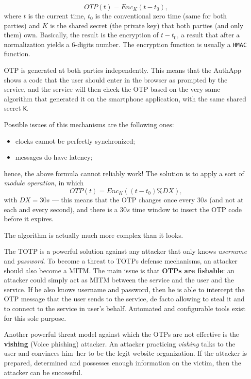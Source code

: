 \documentclass[10pt]{extreport}
\begin{document}
$$ OTP(t) = Enc_K(t - t_0), $$ where $t$ is the current time, $t_0$ is the
conventional zero time (same for both parties) and $K$ is the shared secret
(the private key) that both parties (and only them) own. Basically, the result
is the encryption of $t - t_0$, a result that after a normalization yields a
$6$-digits number. The encryption function is usually a \texttt{HMAC} function.

OTP is generated at both parties independently. This means that the AuthApp
shows a code that the user should enter in the browser as prompted by the
service, and the service will then check the OTP based on the very same
algorithm that generated it on the smartphone application, with the same shared
secret \texttt{K}.

Possible issues of this mechanisms are the following ones:
\begin{itemize}
    \item clocks cannot be perfectly synchronized;
    \item messages do have latency;
\end{itemize}

hence, the above formula cannot reliably work! The solution is to apply a sort
of \emph{module operation}, in which 
$$ OTP(t) = Enc_K((t - t_0) \% DX), $$  with $DX = 30s$ --- this means that the OTP
changes once every $30s$ (and not at each and every second), and there is a
$30s$ time window to insert the OTP code before it expires.

The algorithm is actually much more complex than it looks.

The TOTP is a powerful solution against any attacker that only knows
\emph{username} and \emph{password}. To become a threat to TOTPs defense
mechanisms, an attacker should also become a MITM. The main issue is that
\textbf{OTPs are fishable}: an attacker could simply act as MITM between the
service and the user and the service. If he also knows username and password,
then he is able to intercept the OTP message that the user sends to the
service, de facto allowing to steal it and to connect to the service in user's
behalf. Automated and configurable tools exist for this sole purpose.

Another powerful threat model against which the OTPs are not effective is the
\textbf{vishing} (Voice phishing) attacker. An attacker practicing
\emph{vishing} talks to the user and convinces him\---her to be the legit
website organization. If the attacker is prepared, determined and possesses
enough information on the victim, then the attacker can be successful.
\end{document}
